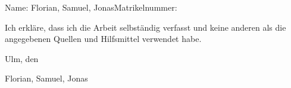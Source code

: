 \documentclass[
    a4paper,
    BCOR32mm,
    10pt,
    bibliography=totoc,
    twoside,
    openright,
    numbers=noenddot,
    headings=normal,
    DIV=9,
    parskip
]{scrbook}
\newcommand{\fullname}{Florian, Samuel, Jonas}
\newcommand{\matnr}{}
\theoremstyle{marginbreak}
\begin{document}
\mainmatter





%


\backmatter

\listoffigures




\cleardoublepage
\thispagestyle{empty}

Name: \fullname \hfill Matrikelnummer: \matnr \vspace{2cm}


Ich erkläre, dass ich die Arbeit selbständig verfasst und keine anderen als die angegebenen Quellen und Hilfsmittel verwendet habe.\vspace{2cm}

Ulm, den \dotfill

\hfill {\footnotesize \fullname}
\end{document}
